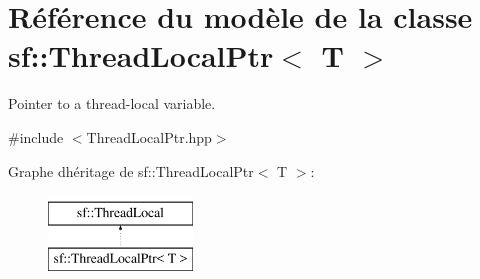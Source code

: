 \hypertarget{classsf_1_1ThreadLocalPtr}{}\section{Référence du modèle de la classe sf\+:\+:Thread\+Local\+Ptr$<$ T $>$}
\label{classsf_1_1ThreadLocalPtr}


Pointer to a thread-\/local variable.  




{\ttfamily \#include $<$Thread\+Local\+Ptr.\+hpp$>$}

Graphe d\textquotesingle{}héritage de sf\+:\+:Thread\+Local\+Ptr$<$ T $>$\+:\begin{figure}[H]
\begin{center}
\leavevmode
\includegraphics[height=2.000000cm]{classsf_1_1ThreadLocalPtr}
\end{center}
\end{figure}
